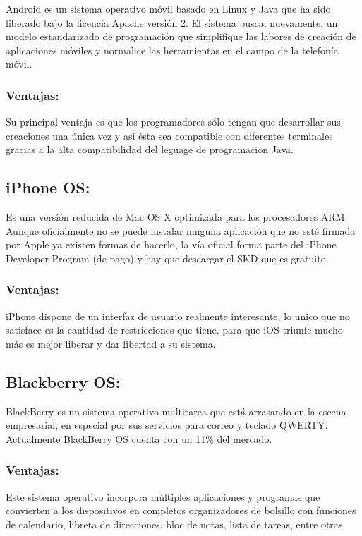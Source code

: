 \documentclass{bmcart}
\begin{document}
Android es un sistema operativo móvil basado en Linux y Java que ha sido
liberado bajo la licencia Apache versión 2.
El sistema busca, nuevamente, un modelo estandarizado de programación que
simplifique las labores de creación de aplicaciones móviles y normalice las
herramientas en el campo de la telefonía móvil.\cite{del2009sistemas}\cite{polanco2011android}

\subsubsection*{Ventajas:}

Su principal ventaja es que los programadores sólo tengan que desarrollar sus creaciones
una única vez y así ésta sea compatible con diferentes terminales gracias a la alta compatibilidad del leguage de programacion Java. 


\subsection*{ iPhone OS:}

Es una versión reducida de Mac OS X optimizada para los procesadores
ARM. Aunque oficialmente no se puede instalar ninguna aplicación que no esté
firmada por Apple ya existen formas de hacerlo, la vía oficial forma parte del iPhone
Developer Program (de pago) y hay que descargar el SKD que es gratuito.\cite{del2009sistemas}

\subsubsection*{Ventajas:}

iPhone dispone de un interfaz de usuario realmente interesante, lo unico que no satisface es la
cantidad de restricciones que tiene. para que iOS
triunfe mucho más es mejor liberar y dar libertad a su sistema.


\subsection*{ Blackberry OS:}

BlackBerry es un sistema operativo multitarea que está arrasando en la escena
empresarial, en especial por sus servicios para correo y teclado QWERTY.
Actualmente BlackBerry OS cuenta con un 11\% del mercado.\cite{del2009sistemas}

\subsubsection*{Ventajas:}
Este sistema operativo incorpora múltiples aplicaciones y programas
que convierten a los dispositivos en completos organizadores de bolsillo con
funciones de calendario, libreta de direcciones, bloc de notas, lista de tareas, entre
otras.
\end{document}
